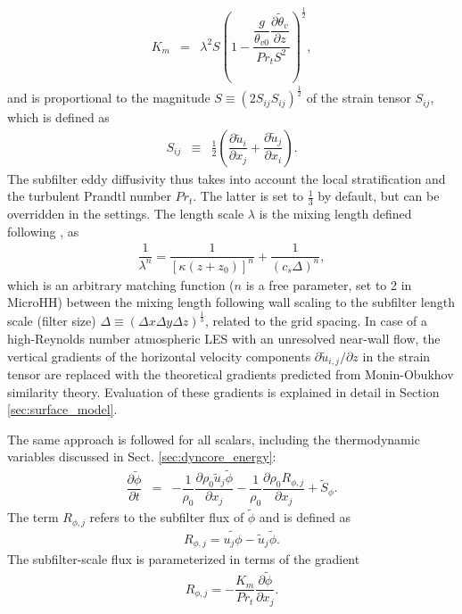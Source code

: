\documentclass[gmd,manuscript]{copernicus}
\newcommand{\uf}{\ensuremath{\widetilde{u}}}
\newcommand{\thetaf}{\ensuremath{\widetilde{\theta}}}
\newcommand{\phif}{\ensuremath{\widetilde{\phi}}}
\begin{document}
\begin{eqnarray}
K_m    & = & \lambda^2 S
\left(1 - \dfrac{  \dfrac{g}{\theta_{v0}} \dfrac{\partial \thetaf_v}{\partial z}}{Pr_t S^2} \right)^\frac{1}{2},
\end{eqnarray}
and is proportional to the magnitude $S \equiv \left( 2 S_{ij} S_{ij} \right)^\frac{1}{2}$ of the strain tensor $S_{ij}$, which is defined as
\begin{eqnarray}
S_{ij} & \equiv & \frac{1}{2} \left( \dfrac{\partial \uf_i}{\partial x_j} + \dfrac{\partial \uf_j}{\partial x_i} \right).
\end{eqnarray}
The subfilter eddy diffusivity thus takes into account the local stratification and the turbulent Prandtl number $Pr_t$. The latter is set to $\frac{1}{3}$ by default, but can be overridden in the settings. The length scale  $\lambda$ is the mixing length defined following \citet{Mason1992}, as
\begin{eqnarray}
\dfrac{1}{\lambda^n} = \dfrac{1}{\left[ \kappa \left(z + z_0 \right) \right]^n} + \dfrac{1}{\left( c_s \Delta \right)^n},
\end{eqnarray}
which is an arbitrary matching function ($n$ is a free parameter, set to 2 in MicroHH) between the mixing length following wall scaling to the subfilter length scale (filter size) $\Delta \equiv (\Delta x \Delta y \Delta z)^\frac{1}{3}$, related to the grid spacing. In case of a high-Reynolds number atmospheric LES with an unresolved near-wall flow, the vertical gradients of the horizontal velocity components $\partial \uf_{i,j}/\partial z$  in the strain tensor are replaced with the theoretical gradients predicted from Monin-Obukhov similarity theory. Evaluation of these gradients is explained in detail in Section \ref{sec:surface_model}.

The same approach is followed for all scalars, including the thermodynamic variables discussed in Sect. \ref{sec:dyncore_energy}:
\begin{eqnarray}
\dfrac{\partial \phif}{\partial t} & = & - \dfrac{1}{\rho_0} \dfrac{\partial \rho_0 \uf_j \phif}{\partial x_j} - \dfrac{1}{\rho_0} \dfrac{\partial \rho_0 R_{\phi,j}}{\partial x_j} + \widetilde{S}_\phi. \label{eq:consscal_filter}
\end{eqnarray}
The term $R_{\phi,j}$ refers to the subfilter flux of $\phif$ and is defined as
\begin{eqnarray}
R_{\phi,j} = \widetilde{u_j \phi} - \uf_j \phif.
\end{eqnarray}
The subfilter-scale flux is parameterized in terms of the gradient
\begin{eqnarray}
R_{\phi,j} = - \dfrac{K_m}{Pr_t} \dfrac{\partial \phif}{\partial x_j}.
\end{eqnarray}
\end{document}
